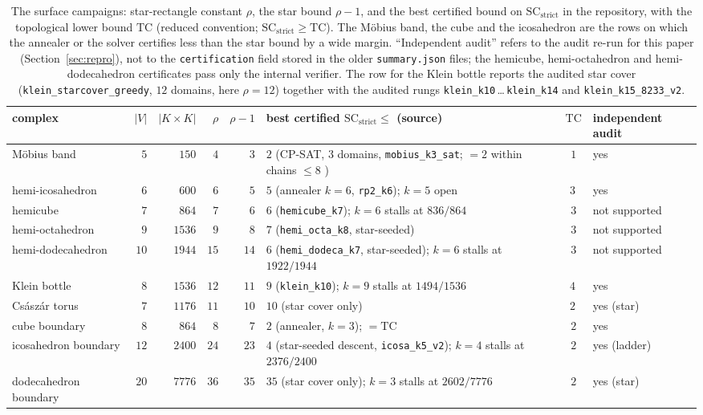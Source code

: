 \documentclass[12pt]{article}
\newcommand{\TC}{\mathrm{TC}}
\newcommand{\SC}{\mathrm{SC}}
\newcommand{\SCst}{\SC_{\mathrm{strict}}}
\begin{document}
\begin{table}[H]
\centering\footnotesize
\setlength{\tabcolsep}{3pt}
\begin{tabular}{@{}lrrrr>{\raggedright\arraybackslash}p{4.1cm}c>{\raggedright\arraybackslash}p{1.9cm}@{}}
\toprule
complex & $|V|$ & $|K{\times}K|$ & $\rho$ & $\rho{-}1$ &
best certified $\SCst\le$ (source) & $\TC$ & independent audit \\
\midrule
M\"obius band & $5$ & $150$ & $4$ & $3$
 & $2$ (CP-SAT, $3$ domains, \texttt{mobius\_k3\_sat}; $=2$ within chains $\le8$ \cite{PM26})
 & $1$ & yes\\
hemi-icosahedron & $6$ & $600$ & $6$ & $5$
 & $5$ (annealer $k{=}6$, \texttt{rp2\_k6}); $k{=}5$ open
 & $3$\,\cite{FTY03} & yes\\
hemicube & $7$ & $864$ & $7$ & $6$
 & $6$ (\texttt{hemicube\_k7}); $k{=}6$ stalls at $836/864$
 & $3$ & not supported\\
hemi-octahedron & $9$ & $1536$ & $9$ & $8$
 & $7$ (\texttt{hemi\_octa\_k8}, star-seeded)
 & $3$ & not supported\\
hemi-dodecahedron & $10$ & $1944$ & $15$ & $14$
 & $6$ (\texttt{hemi\_dodeca\_k7}, star-seeded); $k{=}6$ stalls at $1922/1944$
 & $3$ & not supported\\
Klein bottle & $8$ & $1536$ & $12$ & $11$
 & $9$ (\texttt{klein\_k10}); $k{=}9$ stalls at $1494/1536$
 & $4$\,\cite{CV17} & yes\\
Cs\'asz\'ar torus & $7$ & $1176$ & $11$ & $10$
 & $10$ (star cover only)
 & $2$\,\cite{F03} & yes (star)\\
cube boundary & $8$ & $864$ & $8$ & $7$
 & $2$ (annealer, $k{=}3$); $=\TC$
 & $2$ & yes\\
icosahedron boundary & $12$ & $2400$ & $24$ & $23$
 & $4$ (star-seeded descent, \texttt{icosa\_k5\_v2}); $k{=}4$ stalls at $2376/2400$
 & $2$ & yes (ladder)\\
dodecahedron boundary & $20$ & $7776$ & $36$ & $35$
 & $35$ (star cover only); $k{=}3$ stalls at $2602/7776$
 & $2$ & yes (star)\\
\bottomrule
\end{tabular}
\caption{The surface campaigns: star-rectangle constant $\rho$, the
star bound $\rho-1$, and the best certified bound on $\SCst$ in the
repository, with the topological lower bound $\TC$ (reduced convention;
$\SCst\ge\TC$).  The M\"obius band, the cube and the icosahedron are
the rows on which the annealer or the solver certifies less than the star
bound by a wide margin.  ``Independent audit'' refers to the audit
re-run for this paper (Section~\ref{sec:repro}), not to the
\texttt{certification} field stored in the older \texttt{summary.json}
files; the hemicube, hemi-octahedron and hemi-dodecahedron certificates
pass only the internal verifier.  The row for the Klein bottle reports
the audited star cover (\texttt{klein\_starcover\_greedy}, $12$
domains, here $\rho=12$) together with the audited rungs
\texttt{klein\_k10}\,\dots\,\texttt{klein\_k14} and \texttt{klein\_k15\_8233\_v2}.}
\label{tab:surfaces}
\end{table}
\end{document}
